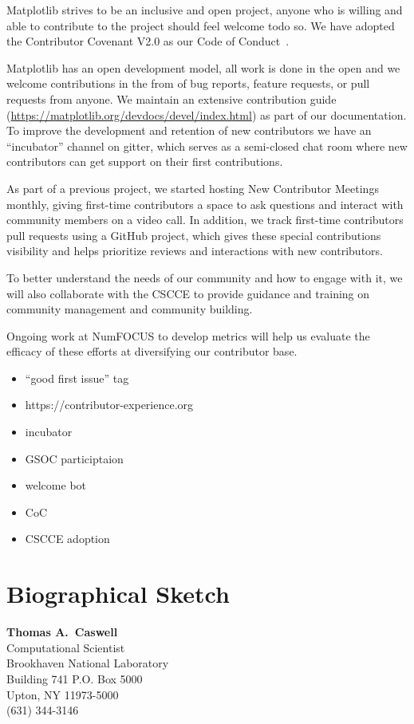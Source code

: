 \documentclass[12pt]{article}
\numberwithin{page}{section}
\begin{document}
Matplotlib strives to be an inclusive and open project, anyone who is willing
and able to contribute to the project should feel welcome todo so. We have
adopted the Contributor Covenant V2.0 as our Code of Conduct~\cite{CoC}.

Matplotlib has an open development model, all work is done in the open and we
welcome contributions in the from of bug reports, feature requests, or pull
requests from anyone. We maintain an extensive contribution guide
(\url{https://matplotlib.org/devdocs/devel/index.html}) as part of our
documentation. To improve the development and retention of new contributors we
have an ``incubator'' channel on gitter, which serves as a semi-closed chat
room where new contributors can get support on their first contributions.

As part of a previous project, we started hosting New Contributor Meetings
monthly, giving first-time contributors a space to ask questions and interact
with community members on a video call. In addition, we track first-time
contributors pull requests using a GitHub project, which gives these special
contributions visibility and helps prioritize reviews and interactions with new
contributors.

To better understand the needs of our community and how to engage with it, we
will also collaborate with the CSCCE to provide guidance and training on
community management and community building.

Ongoing work at NumFOCUS to develop metrics will help us evaluate the efficacy
of these efforts at diversifying our contributor base.


  \begin{itemize}
  \item  ``good first issue'' tag
  \item https://contributor-experience.org
  \item incubator
  \item GSOC participtaion
  \item welcome bot
  \item CoC
  \item CSCCE adoption
  \end{itemize}





\newpage
\section{Biographical Sketch}
\setcounter{page}{1}
\begin{center}
  \textbf{Thomas A.\ Caswell}\\
  Computational Scientist\\
  Brookhaven National Laboratory\\
  Building 741 P.O. Box 5000\\
  Upton, NY 11973-5000\\
  (631) 344-3146\\
\end{center}
\end{document}
